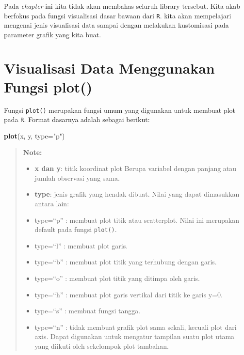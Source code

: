 \documentclass[]{book}
\newenvironment{Shaded}{\begin{snugshade}}{\end{snugshade}}
\newcommand{\KeywordTok}[1]{\textcolor[rgb]{0.13,0.29,0.53}{\textbf{#1}}}
\newcommand{\DataTypeTok}[1]{\textcolor[rgb]{0.13,0.29,0.53}{#1}}
\newcommand{\StringTok}[1]{\textcolor[rgb]{0.31,0.60,0.02}{#1}}
\newcommand{\NormalTok}[1]{#1}
\providecommand{\tightlist}{%
  \setlength{\itemsep}{0pt}\setlength{\parskip}{0pt}}
\begin{document}
Pada \emph{chapter} ini kita tidak akan membahas seluruh library
tersebut. Kita akab berfokus pada fungsi visualisasi dasar bawaan dari
\texttt{R}. kita akan mempelajari mengenai jenis visualisasi data sampai
dengan melakukan kustomisasi pada parameter grafik yang kita buat.

\section{Visualisasi Data Menggunakan Fungsi
plot()}\label{visualisasi-data-menggunakan-fungsi-plot}

Fungsi \texttt{plot()} merupakan fungsi umum yang digunakan untuk
membuat plot pada \texttt{R}. Format dasarnya adalah sebagai berikut:

\begin{Shaded}
\begin{Highlighting}[]
\KeywordTok{plot}\NormalTok{(x, y, }\DataTypeTok{type=}\StringTok{"p"}\NormalTok{)}
\end{Highlighting}
\end{Shaded}

\begin{quote}
\textbf{Note: }

\begin{itemize}
\tightlist
\item
  \textbf{x dan y}: titik koordinat plot Berupa variabel dengan panjang
  atau jumlah observasi yang sama.
\item
  \textbf{type}: jenis grafik yang hendak dibuat. Nilai yang dapat
  dimasukkan antara lain:
\item
  type=``p'' : membuat plot titik atau scatterplot. Nilai ini merupakan
  default pada fungsi \texttt{plot()}.
\item
  type=``l'' : membuat plot garis.
\item
  type=``b'' : membuat plot titik yang terhubung dengan garis.
\item
  type=``o'' : membuat plot titik yang ditimpa oleh garis.
\item
  type=``h'' : membuat plot garis vertikal dari titik ke garis y=0.
\item
  type=``s'' : membuat fungsi tangga.
\item
  type=``n'' : tidak membuat grafik plot sama sekali, kecuali plot dari
  axis. Dapat digunakan untuk mengatur tampilan suatu plot utama yang
  diikuti oleh sekelompok plot tambahan.
\end{itemize}
\end{quote}
\end{document}
